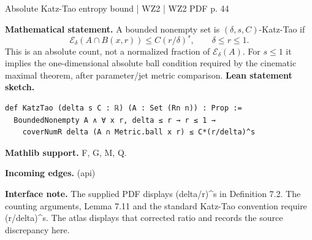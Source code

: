 \documentclass[10pt,a4paper]{article}
\newcommand{\nodecard}[1]{\hyperlink{node-#1}{\texttt{\detokenize{#1}}}}
\begin{document}
\begin{minipage}{\linewidth}
\hypertarget{node-W2DKT}{}
\begin{tcolorbox}[colback=white,colframe=cinematicfg,colbacktitle=cinematicbg,coltitle=ink,boxrule=0.45pt,arc=1.6mm,left=3mm,right=3mm,top=2mm,bottom=2mm,title={\sffamily\bfseries WZ2 Definition 7.2 \hfill \texttt{W2DKT}}]
{\sffamily\small\color{muted}Absolute Katz-Tao entropy bound | WZ2 | WZ2 PDF p. 44}\par
\textbf{Mathematical statement.} A bounded nonempty set is $(\delta,s,C)$-Katz-Tao if
\[\mathcal E_\delta(A\cap B(x,r))\le C(r/\delta)^s,\qquad\delta\le r\le1.\]
This is an absolute count, not a normalized fraction of $\mathcal E_\delta(A)$.
For $s\le1$ it implies the one-dimensional absolute ball condition required by the cinematic maximal theorem, after parameter/jet metric comparison.
\smallskip\textbf{Lean statement sketch.}
\begin{Verbatim}[fontsize=\small,breaklines=true,breakanywhere=true,tabsize=2]
def KatzTao (delta s C : ℝ) (A : Set (Rn n)) : Prop :=
  BoundedNonempty A ∧ ∀ x r, delta ≤ r → r ≤ 1 →
    coverNumR delta (A ∩ Metric.ball x r) ≤ C*(r/delta)^s
\end{Verbatim}
{\footnotesize\textbf{Mathlib support.} F, G, M, Q.\par
\textbf{Incoming edges.} \nodecard{Ientropy} (api)\par}
{\footnotesize\textbf{Interface note.} The supplied PDF displays (delta/r)\textasciicircum{}s in Definition 7.2. The counting arguments, Lemma 7.11 and the standard Katz-Tao convention require (r/delta)\textasciicircum{}s. The atlas displays that corrected ratio and records the source discrepancy here.}
\end{tcolorbox}\end{minipage}\par\medskip
\end{document}

